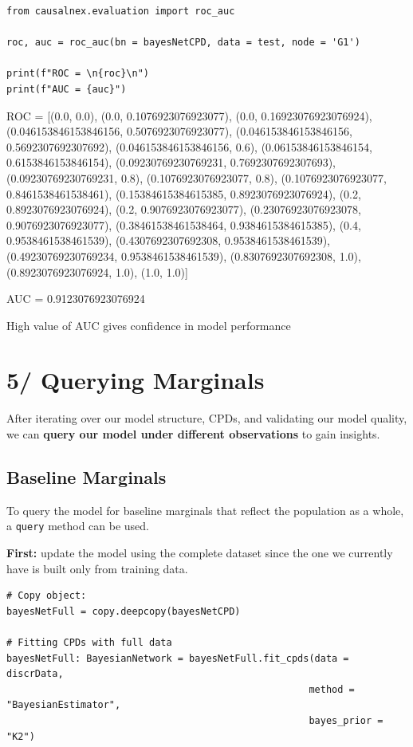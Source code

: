 \documentclass[
]{article}
\begin{document}
\begin{verbatim}
from causalnex.evaluation import roc_auc

roc, auc = roc_auc(bn = bayesNetCPD, data = test, node = 'G1')

print(f"ROC = \n{roc}\n")
print(f"AUC = {auc}")
\end{verbatim}

ROC = {[}(0.0, 0.0), (0.0, 0.1076923076923077), (0.0,
0.16923076923076924), (0.046153846153846156, 0.5076923076923077),
(0.046153846153846156, 0.5692307692307692), (0.046153846153846156, 0.6),
(0.06153846153846154, 0.6153846153846154), (0.09230769230769231,
0.7692307692307693), (0.09230769230769231, 0.8), (0.1076923076923077,
0.8), (0.1076923076923077, 0.8461538461538461), (0.15384615384615385,
0.8923076923076924), (0.2, 0.8923076923076924), (0.2,
0.9076923076923077), (0.23076923076923078, 0.9076923076923077),
(0.38461538461538464, 0.9384615384615385), (0.4, 0.9538461538461539),
(0.4307692307692308, 0.9538461538461539), (0.49230769230769234,
0.9538461538461539), (0.8307692307692308, 1.0), (0.8923076923076924,
1.0), (1.0, 1.0){]}

AUC = 0.9123076923076924

High value of AUC gives confidence in model performance

\hypertarget{querying-marginals}{%
\section{5/ Querying Marginals}\label{querying-marginals}}

After iterating over our model structure, CPDs, and validating our model
quality, we can \textbf{query our model under different observations} to
gain insights.

\hypertarget{baseline-marginals}{%
\subsection{Baseline Marginals}\label{baseline-marginals}}

To query the model for baseline marginals that reflect the population as
a whole, a \texttt{query} method can be used.

\textbf{First:} update the model using the complete dataset since the
one we currently have is built only from training data.

\begin{verbatim}
# Copy object:
bayesNetFull = copy.deepcopy(bayesNetCPD)

# Fitting CPDs with full data
bayesNetFull: BayesianNetwork = bayesNetFull.fit_cpds(data = discrData,
                                                     method = "BayesianEstimator",
                                                     bayes_prior = "K2")
\end{verbatim}
\end{document}
